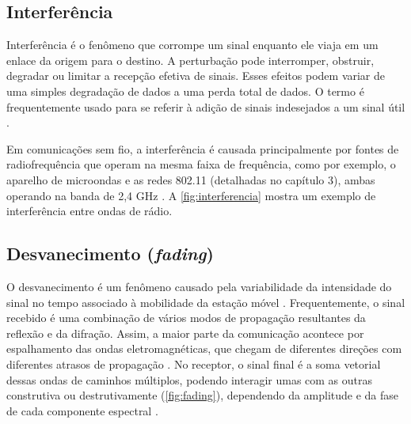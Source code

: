 \subsection{Interferência}
\label{sub:interferencia}

Interferência é o fenômeno que corrompe um sinal enquanto ele viaja em um enlace da origem para o destino. A perturbação pode interromper, obstruir, degradar ou limitar a recepção efetiva de sinais. Esses efeitos podem variar de uma simples degradação de dados a uma perda total de dados. O termo é frequentemente usado para se referir à adição de sinais indesejados a um sinal útil \cite{flickenger2008}.

Em comunicações sem fio, a interferência é causada principalmente por fontes de radiofrequência que operam na mesma faixa de frequência, como por exemplo, o aparelho de microondas e as redes 802.11 (detalhadas no capítulo 3), ambas operando na banda de 2,4 GHz \cite{moraes2010}. A \autoref{fig:interferencia} mostra um exemplo de interferência entre ondas de rádio.
\begin{figure}[H]
	\centering
\end{figure}

\subsection{Desvanecimento (\textit{fading})}
\label{sub:desvanecimento}

O desvanecimento é um fenômeno causado pela variabilidade da intensidade do sinal no tempo associado à mobilidade da estação móvel \cite{haykin2008,rappaport2009}. Frequentemente, o sinal recebido é uma combinação de vários modos de propagação resultantes da reflexão e da difração. Assim, a maior parte da comunicação acontece por espalhamento das ondas eletromagnéticas, que chegam de diferentes direções com diferentes atrasos de propagação \cite{haykin2008}. No receptor, o sinal final é a soma vetorial dessas ondas de caminhos múltiplos, podendo interagir umas com as outras construtiva ou destrutivamente (\autoref{fig:fading}), dependendo da amplitude e da fase de cada componente espectral \cite{haykin2008}.

